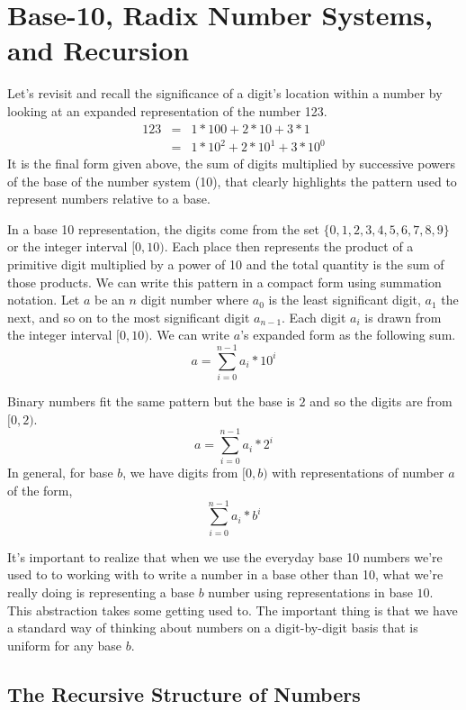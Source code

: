 \documentclass[10pt]{article}
\begin{document}
\section{Base-10, Radix Number Systems, and Recursion}

Let's revisit and recall the significance of a digit's location within a number by looking at an expanded representation of the number 123.
\[
\begin{array}{rcl}
123 &=& 1*100 + 2*10 + 3*1 \\
    &=& 1*10^2 + 2*10^1 + 3*10^0
\end{array}
\]
It is the final form given above, the sum of digits multiplied by successive powers of the base of the number system (10), that clearly highlights the pattern used to represent numbers relative to a base. 

In a base 10 representation, the digits come from the set $\{0,1,2,3,4,5,6,7,8,9\}$ or the integer interval $[0,10)$. Each place then represents the product of a primitive digit multiplied by a power of 10 and the total quantity is the sum of those products. We can write this pattern in a compact form using summation notation. Let $a$ be an $n$ digit number where $a_0$ is the least significant digit, $a_1$ the next, and so on to the most significant digit $a_{n-1}$. Each digit $a_i$ is drawn from the integer interval $[0,10)$. We can write $a$'s expanded form as the following sum.
\[
a = \sum\limits_{i=0}^{n-1} a_i*10^{i}
\] 

Binary numbers fit the same pattern but the base is $2$ and so the digits are from $[0,2)$.
\[
a = \sum\limits_{i=0}^{n-1} a_i*2^{i}
\] 
In general, for base $b$, we have digits from $[0,b)$ with representations of number $a$ of the form,
\[
\sum\limits_{i=0}^{n-1} a_i*b^{i}
\]

It's important to realize that when we use the everyday base 10 numbers we're used to to working with to write a number in a base other than 10, what we're really doing is representing a base $b$ number using representations in base $10$. This abstraction takes some getting used to. The important thing is that we have a standard way of thinking about numbers on a digit-by-digit basis that is uniform for any base $b$. 

\subsection*{The Recursive Structure of Numbers}
\end{document}

